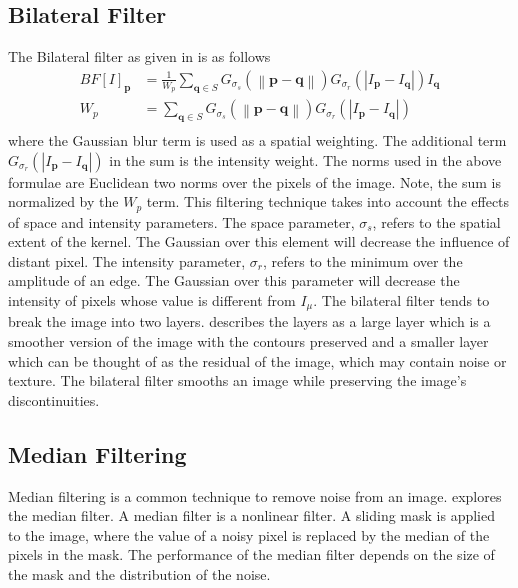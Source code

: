 \documentclass{article}
\newcommand{\norm}[1]{\left\| #1 \right\|}
\begin{document}
\subsection{Bilateral Filter}
\label{subsec:bilateral-filter}
The Bilateral filter as given in \cite{Faisal-bilateral} is as follows
%
\begin{align*}
  BF[I]_{\textbf{p}}&= \displaystyle \frac{1}{W_p} \sum_{\textbf{q} \in S} G_{\sigma_s} \left(\norm{\textbf{p} - \textbf{q}}\right)
  G_{\sigma_r} \left(|I_{\textbf{p}} - I_{\textbf{q}}|\right)I_{\textbf{q}} \\
  W_p &= \sum_{\textbf{q} \in S} G_{\sigma_s} \left(\norm{\textbf{p} - \textbf{q}}\right)
        G_{\sigma_r} \left(|I_{\textbf{p}} - I_{\textbf{q}}|\right) \\
\end{align*}
%
where the Gaussian blur term is used as a spatial weighting. The
additional term
\(G_{\sigma_r} \left(|I_{\textbf{p}} - I_{\textbf{q}}|\right)\) in the
sum is the intensity weight. The norms used in the above formulae are
Euclidean two norms over the pixels of the image.  Note, the sum is normalized by the
\(W_p\) term. This filtering technique takes into account the effects
of space and intensity parameters. The space parameter, $\sigma_s$,
refers to the spatial extent of the kernel. The Gaussian over this
element will decrease the influence of distant pixel. The intensity
parameter, $\sigma_r$, refers to the minimum over the amplitude of an
edge. The Gaussian over this parameter will decrease the intensity of
pixels whose value is different from $I_{\textbf{\(\mu\)}}$. The
bilateral filter tends to break the image into two
layers. \cite{bilateral} describes the layers as a large layer which
is a smoother version of the image with the contours preserved and a
smaller layer which can be thought of as the residual of the image,
which may contain noise or texture. The bilateral filter smooths an
image while preserving the image's discontinuities.
%
\subsection{Median Filtering}
\label{subsec:median-filter}
%
Median filtering is a common technique to remove noise from an
image. \cite{Med2012} explores the median filter. A median filter is a
nonlinear filter. A sliding mask is applied to the image, where the
value of a noisy pixel is replaced by the median of the pixels in
the mask. The performance of the median filter depends on the size
of the mask and the distribution of the noise.
\end{document}
